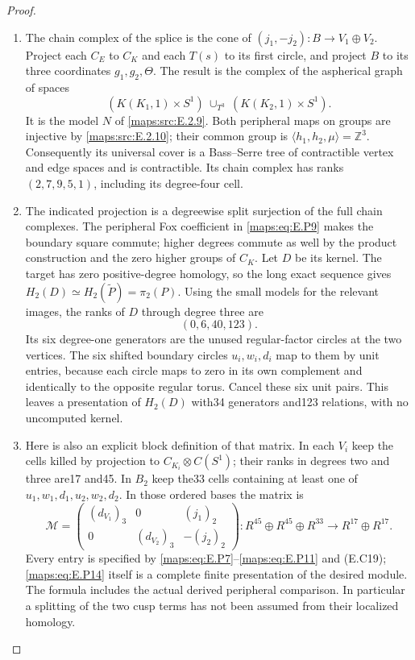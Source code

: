 \begin{proof}
\begin{enumerate}[label=\arabic*.,leftmargin=*]
\item The chain complex of the splice is the cone of
$(j_1,-j_2):B\to V_1\oplus V_2$.
Project each $C_E$ to $C_K$ and each $T(s)$ to its
first circle, and project $B$ to its three coordinates
$g_1,g_2,\Theta$. The result is the complex of the
aspherical graph of spaces
\[
 (K(K_1,1)\times S^1)\ \cup_{T^3}\
                         (K(K_2,1)\times S^1).
 \tag{E.P12}\label{maps:eq:E.P12}
\]
It is the model $N$ of \ref{maps:src:E.2.9}. Both peripheral maps
on groups are injective by \ref{maps:src:E.2.10}; their common
group is $\langle h_1,h_2,\mu\rangle=\mathbb Z^3$.
Consequently its universal cover is a Bass--Serre
tree of contractible vertex and edge spaces and
is contractible. Its chain complex has ranks
$(2,7,9,5,1)$, including its degree-four cell.

\item The indicated projection is a degreewise split
surjection of the full chain complexes. The
peripheral Fox coefficient in \eqref{maps:eq:E.P9} makes the
boundary square commute; higher degrees commute
as well by the product construction and the
zero higher groups of $C_K$. Let $D$ be its kernel.
The target has zero positive-degree homology, so
the long exact sequence gives
$H_2(D)\simeq H_2(\widetilde P)=\pi_2(P)$.
Using the small models for the relevant images,
the ranks of $D$ through degree three are
\[
                         (0,6,40,123).
 \tag{E.P13}\label{maps:eq:E.P13}
\]
Its six degree-one generators are the unused
regular-factor circles at the two vertices.
The six shifted boundary circles $u_i,w_i,d_i$
map to them by unit entries, because each circle
maps to zero in its own complement and identically
to the opposite regular torus. Cancel these six
unit pairs. This leaves a presentation of $H_2(D)$
with34 generators and123 relations, with no
uncomputed kernel.

\item Here is also an explicit block definition of that
matrix. In each $V_i$ keep the cells killed by
projection to $C_{K_i}\otimes C(S^1)$; their ranks
in degrees two and three are17 and45. In $B_2$
keep the33 cells containing at least one of
$u_1,w_1,d_1,u_2,w_2,d_2$. In those ordered bases
the matrix is
\[
 \mathcal M=
 \begin{pmatrix}
 (d_{V_1})_3&0&(j_1)_2\\
 0&(d_{V_2})_3&-(j_2)_2
 \end{pmatrix}:
 R^{45}\oplus R^{45}\oplus R^{33}
             \longrightarrow R^{17}\oplus R^{17}.
 \tag{E.P14}\label{maps:eq:E.P14}
\]
Every entry is specified by \eqref{maps:eq:E.P7}--\eqref{maps:eq:E.P11} and
(E.C19); \eqref{maps:eq:E.P14} itself is a complete finite
presentation of the desired module. The formula
includes the actual derived peripheral comparison.
In particular a splitting of the two cusp terms
has not been assumed from their localized homology.


\end{enumerate}
\end{proof}
